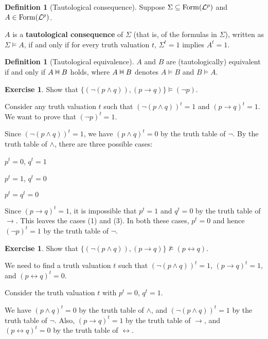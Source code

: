 \documentclass[11pt]{article}
\makeatletter
\theoremstyle{definition}
\newtheorem{defn}[thm]{Definition}
\newtheorem{exercise}[thm]{Exercise}
\newcommand{\vDashv}{%
  \mathrel{%
    \text{%
      \ooalign{$\vDash$\cr\reflectbox{$\vDash$}\cr}%
    }%
  }%
}
\newenvironment{pf}[1][\proofname]{\par
  \pushQED{\qed}%
  \normalfont \topsep0\p@\relax
  \trivlist
  \item[\hskip\labelsep\itshape
  #1\@addpunct{.}]\ignorespaces
}{%
  \popQED\endtrivlist\@endpefalse
}
\makeatother
\begin{document}
\begin{defn}[Tautological consequence]
Suppose $\Sigma \subseteq {\rm Form}(\mathcal{L}^p)$ and $A \in {\rm Form}(\mathcal{L}^p)$. 

$A$ is a {\bf tautological consequence} of $\Sigma$ (that is, of the formulas in $\Sigma$), written as $\Sigma \vDash A$, if and only if for every truth valuation $t$, $\Sigma^t = 1$ implies $A^t = 1$.
\end{defn}

\begin{defn}[Tautological equivalence]
$A$ and $B$ are (tautologically) equivalent if and only if $A \vDashv B$ holds, where $A \vDashv B$ denotes $A \vDash B$ and $B \vDash A$. 
\end{defn}

\begin{exercise} 
Show that $\{(\neg (p \wedge q)), (p \rightarrow q)\} \vDash (\neg p)$.
\end{exercise}
\begin{pf}
Consider any truth valuation $t$ such that $(\neg (p \wedge q))^t = 1$ and $(p \rightarrow q)^t = 1$. We want to prove that $(\neg p)^t = 1$. 

Since $(\neg (p \wedge q))^t = 1$, we have $(p \wedge q)^t = 0$ by the truth table of $\neg$. By the truth table of $\wedge$, there are three possible cases: 

\begin{center}
\begin{enumerate*}[(1)]
\item $p^t = 0$, $q^t = 1$ \quad
\item $p^t = 1$, $q^t = 0$ \quad
\item $p^t = q^t = 0$
\end{enumerate*}
\end{center}

Since $(p \rightarrow q)^t = 1$, it is impossible that $p^t = 1$ and $q^t = 0$ by the truth table of $\rightarrow$. This leaves the cases (1) and (3). In both these cases, $p^t = 0$ and hence $(\neg p)^t = 1$ by the truth table of $\neg$.
\end{pf}

\begin{exercise}
Show that $\{(\neg (p \wedge q)), (p \rightarrow q)\} \nvDash (p \leftrightarrow q)$.
\end{exercise}
\begin{pf}
We need to find a truth valuation $t$ such that $(\neg (p \wedge q))^t = 1$, $(p \rightarrow q)^t = 1$, and $(p \leftrightarrow q)^t = 0$. 

Consider the truth valuation $t$ with $p^t = 0$, $q^t = 1$.

We have $(p \wedge q)^t = 0$ by the truth table of $\wedge$, and $(\neg (p \wedge q))^t = 1$ by the truth table of $\neg$. 
Also, $(p \rightarrow q)^t = 1$ by the truth table of $\rightarrow$, and $(p \leftrightarrow q)^t = 0$ by the truth table of $\leftrightarrow$.
\end{pf}
\end{document}
